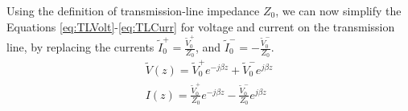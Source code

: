 \documentclass{ximera}
\begin{document}
Using the definition of transmission-line impedance $Z_0$, we can now simplify the Equations \ref{eq:TLVolt}-\ref{eq:TLCurr} for voltage and current on the transmission line, by replacing the currents $\tilde{I}_0^+=\frac{\tilde{V}_0^+}{Z_0} $, and $\tilde{I}_0^- = -\frac{\tilde{V}_0^-}{Z_0}$.
\begin{eqnarray}
\tilde{V}(z)=\tilde{V}_0^+ e^{-j \beta z} +\tilde{V}_0^- e^{j \beta z} \label{eq:TLIvtl} \\ 
I(z)=\frac{\tilde{V}_0^+}{Z_0} e^{- j \beta z} - \frac{\tilde{V}_0^-}{Z_0} e^{j \beta z}\label{eq:TLIctl}
\end{eqnarray}
 
\end{document}
